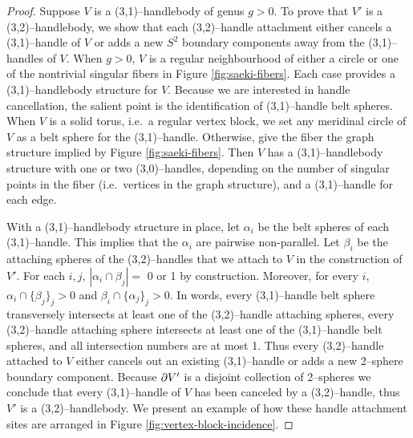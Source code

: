 \begin{proof}
	Suppose $V$ is a (3,1)--handlebody of genus $g>0$.
	To prove that $V'$ is a (3,2)--handlebody, we show that each (3,2)--handle attachment either cancels a (3,1)--handle of $V$ or adds a new $S^2$ boundary components away from the (3,1)--handles of $V$.
	When $g>0$, $V$ is a regular neighbourhood of either a circle or one of the nontrivial singular fibers in Figure \ref{fig:saeki-fibers}.
	Each case provides a (3,1)--handlebody structure for $V$.
	Because we are interested in handle cancellation, the salient point is the identification of (3,1)--handle belt spheres.
	When $V$ is a solid torus, i.e.\ a regular vertex block, we set any meridinal circle of $V$ as a belt sphere for the (3,1)--handle.
	Otherwise, give the fiber the graph structure implied by Figure \ref{fig:saeki-fibers}.
	Then $V$ has a (3,1)--handlebody structure with one or two (3,0)--handles, depending on the number of singular points in the fiber (i.e.\ vertices in the graph structure), and a (3,1)--handle for each edge.
	
	With a (3,1)--handlebody structure in place, let $\alpha_i$ be the belt spheres of each (3,1)--handle.
	This implies that the $\alpha_i$ are pairwise non-parallel.
	Let $\beta_i$ be the attaching spheres of the (3,2)--handles that we attach to $V$ in the construction of $V'$.
	For each $i,j$, $|\alpha_i\cap\beta_j|=$ 0 or 1 by construction.
	Moreover, for every $i$, $\alpha_i\cap\{\beta_j\}_j>0$ and $\beta_i\cap\{\alpha_j\}_j>0$.
	In words, every (3,1)--handle belt sphere transversely intersects at least one of the (3,2)--handle attaching spheres, every (3,2)--handle attaching sphere intersects at least one of the (3,1)--handle belt spheres, and all intersection numbers are at most 1.
	Thus every (3,2)--handle attached to $V$ either cancels out an existing (3,1)--handle or adds a new 2--sphere boundary component.
	Because $\partial V'$ is a disjoint collection of 2--spheres we conclude that every (3,1)--handle of $V$ has been canceled by a (3,2)--handle, thus $V'$ is a (3,2)--handlebody.
	We present an example of how these handle attachment sites are arranged in Figure \ref{fig:vertex-block-incidence}.
	

\end{proof}
